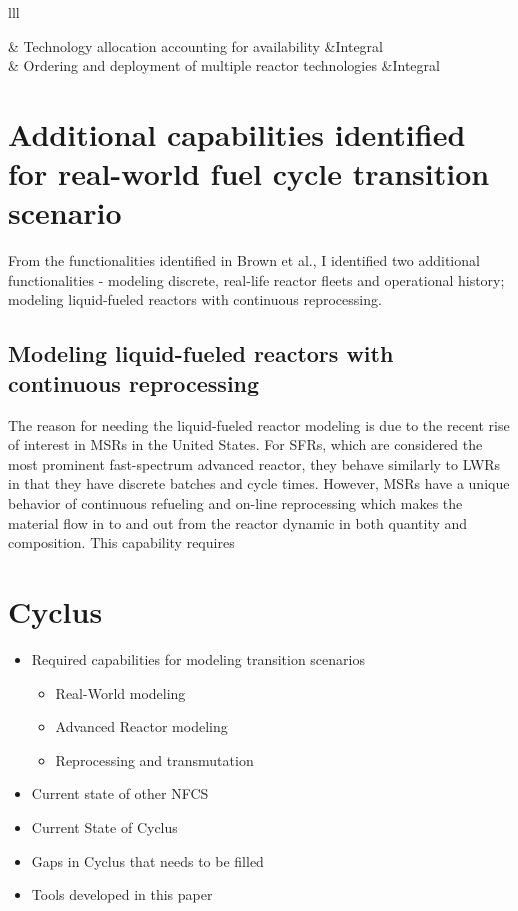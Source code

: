 \begin{table}[h]
\begin{tabular}{lll}
        \hline

         & Technology allocation accounting for availability &Integral \\
        	& Ordering and deployment of multiple reactor technologies &Integral \\
        \hline
    \end{tabular}
\end{table}

\section{Additional capabilities identified for real-world fuel cycle transition scenario}
From the functionalities identified in Brown et al., I identified two additional functionalities -
modeling discrete, real-life reactor fleets and operational history; modeling liquid-fueled
reactors with continuous reprocessing.

\subsection{Modeling liquid-fueled reactors with continuous reprocessing}
The reason for needing the liquid-fueled reactor modeling
is due to the recent rise of interest in \glspl{MSR} in the United States. For \glspl{SFR},
which are considered the most prominent fast-spectrum advanced reactor, they behave similarly to \glspl{LWR}
in that they have discrete batches and cycle times. However, \glspl{MSR} have a unique behavior
of continuous refueling and on-line reprocessing which makes the material flow in to and out from the reactor
dynamic in both quantity and composition. This capability requires 



\section{Cyclus}




\begin{itemize}
	\item Required capabilities for modeling transition scenarios
	\begin{itemize}
		\item Real-World modeling
		\item Advanced Reactor modeling
		\item Reprocessing and transmutation
	\end{itemize}
	\item Current state of other \gls{NFCS}
	\item Current State of Cyclus
	\item Gaps in Cyclus that needs to be filled
	\item Tools developed in this paper
\end{itemize}